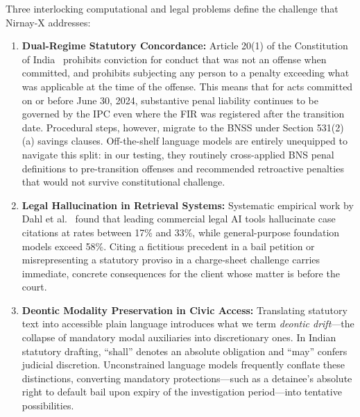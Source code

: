 \documentclass[conference]{IEEEtran}
\begin{document}
Three interlocking computational and legal problems define the challenge that Nirnay-X addresses:
\begin{enumerate}
    \item \textbf{Dual-Regime Statutory Concordance:} Article 20(1) of the Constitution of India~\cite{constitution1950} prohibits conviction for conduct that was not an offense when committed, and prohibits subjecting any person to a penalty exceeding what was applicable at the time of the offense. This means that for acts committed on or before June 30, 2024, substantive penal liability continues to be governed by the IPC even where the FIR was registered after the transition date. Procedural steps, however, migrate to the BNSS under Section 531(2)(a) savings clauses. Off-the-shelf language models are entirely unequipped to navigate this split: in our testing, they routinely cross-applied BNS penal definitions to pre-transition offenses and recommended retroactive penalties that would not survive constitutional challenge.

    \item \textbf{Legal Hallucination in Retrieval Systems:} Systematic empirical work by Dahl et al.~\cite{dahl2024large} found that leading commercial legal AI tools hallucinate case citations at rates between 17\% and 33\%, while general-purpose foundation models exceed 58\%. Citing a fictitious precedent in a bail petition or misrepresenting a statutory proviso in a charge-sheet challenge carries immediate, concrete consequences for the client whose matter is before the court.

    \item \textbf{Deontic Modality Preservation in Civic Access:} Translating statutory text into accessible plain language introduces what we term \textit{deontic drift}---the collapse of mandatory modal auxiliaries into discretionary ones. In Indian statutory drafting, ``shall'' denotes an absolute obligation and ``may'' confers judicial discretion. Unconstrained language models frequently conflate these distinctions, converting mandatory protections---such as a detainee's absolute right to default bail upon expiry of the investigation period---into tentative possibilities.
\end{enumerate}
\end{document}
